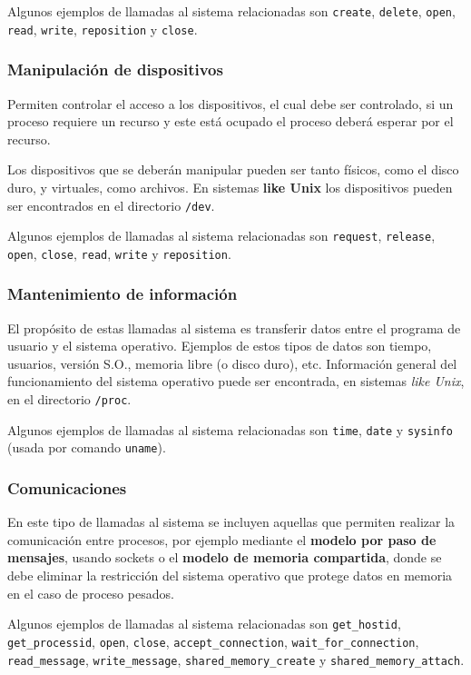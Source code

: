 Algunos ejemplos de llamadas al sistema relacionadas son \texttt{create},
\texttt{delete}, \texttt{open}, \texttt{read}, \texttt{write},
\texttt{reposition} y \texttt{close}.

\subsubsection{Manipulación de dispositivos}
Permiten controlar el acceso a los dispositivos, el cual debe ser controlado, si
un proceso requiere un recurso y este está ocupado el proceso deberá esperar por
el recurso.

Los dispositivos que se deberán manipular pueden ser tanto físicos, como el
disco duro, y virtuales, como archivos. En sistemas \textbf{like Unix} los
dispositivos pueden ser encontrados en el directorio \texttt{/dev}.

Algunos ejemplos de llamadas al sistema relacionadas son \texttt{request},
\texttt{release}, \texttt{open}, \texttt{close}, \texttt{read}, \texttt{write} y
\texttt{reposition}.

\subsubsection{Mantenimiento de información}
El propósito de estas llamadas al sistema es transferir datos entre el programa
de usuario y el sistema operativo. Ejemplos de estos tipos de datos son tiempo,
usuarios, versión S.O., memoria libre (o disco duro), etc. Información general
del funcionamiento del sistema operativo puede ser encontrada, en sistemas
\textit{like Unix}, en el directorio \texttt{/proc}.

Algunos ejemplos de llamadas al sistema relacionadas son \texttt{time},
\texttt{date} y \texttt{sysinfo} (usada por comando \texttt{uname}).

\subsubsection{Comunicaciones}
En este tipo de llamadas al sistema se incluyen aquellas que permiten realizar
la comunicación entre procesos, por ejemplo mediante el \textbf{modelo por paso
de mensajes}, usando sockets o el \textbf{modelo de memoria compartida}, donde
se debe eliminar la restricción del sistema operativo que protege datos en
memoria en el caso de proceso pesados.

Algunos ejemplos de llamadas al sistema relacionadas son \texttt{get\_hostid},
\texttt{get\_processid}, \texttt{open}, \texttt{close},
\texttt{accept\_connection}, \texttt{wait\_for\_connection},
\texttt{read\_message}, \texttt{write\_message}, \texttt{shared\_memory\_create}
y \texttt{shared\_memory\_attach}.

